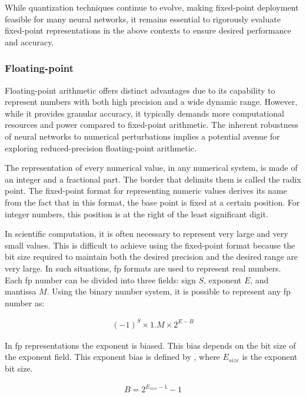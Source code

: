 While quantization techniques continue to evolve, making fixed-point deployment feasible for many neural networks, it remains essential to rigorously evaluate fixed-point representations in the above contexts to ensure desired performance and accuracy.



\subsubsection{Floating-point}
Floating-point arithmetic offers distinct advantages due to its capability to represent numbers with both high precision and a wide dynamic range. However, while it provides granular accuracy, it typically demands more computational resources and power compared to fixed-point arithmetic. The inherent robustness of neural networks to numerical perturbations implies a potential avenue for exploring reduced-precision floating-point arithmetic.

The representation of every numerical value, in any numerical system, is made of an integer and a fractional part. The border that delimits them is called the radix point. The fixed-point format for representing numeric values derives its name from the fact that in this format, the base point is fixed at a certain position. For integer numbers, this position is at the right of the least significant digit.

In scientific computation, it is often necessary to represent very large and very small values. This is difficult to achieve using the fixed-point format because the bit size required to maintain both the desired precision and the desired range are very large. In such situations, \gls{fp} formats are used to represent real numbers. Each \gls{fp} number can be divided into three fields: sign $S$, exponent $E$, and mantissa $M$. Using the binary number system, it is possible to represent any \gls{fp} number as:

\begin{eqnarray} \label{eq:float}
(-1)^{S} \times 1.M \times 2^{E-B}
\end{eqnarray}

In \gls{fp} representations the exponent is biased. This bias depends on the bit size of the exponent field. This exponent bias is defined by , where $E_{size}$ is the exponent bit size.

\begin{eqnarray} \label{eq:float_bias}
B=2^{E_{size}-1}-1
\end{eqnarray}

